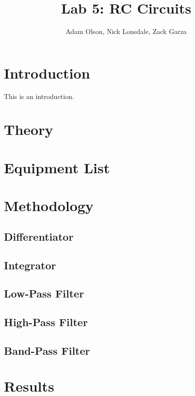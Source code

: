\documentclass[a4paper,10pt]{report}
\title{Lab 5: RC Circuits}
\author{Adam Olson, Nick Lonsdale, Zack Garza}
\begin{document}
\maketitle

\begin{abstract}
\end{abstract}



\maketitle
\tableofcontents

\chapter{Introduction}
This is an introduction.

\chapter{Theory}

\chapter{Equipment List}
\chapter{Methodology}
	\section{Differentiator}
	\section{Integrator}
	\section{Low-Pass Filter}
	\section{High-Pass Filter}
	\section{Band-Pass Filter}

\chapter{Results}
\end{document}
